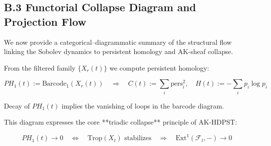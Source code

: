 \documentclass[11pt]{article}
\theoremstyle{definition}
\begin{document}
\subsection*{B.3 Functorial Collapse Diagram and Projection Flow}

We now provide a categorical–diagrammatic summary of the structural flow linking the Sobolev dynamics to persistent homology and AK-sheaf collapse.

\begin{center}
\end{center}

\vspace{0.5em}

From the filtered family $\{X_r(t)\}$ we compute persistent homology:

\[
PH_1(t) := \text{Barcode}_1(X_r(t))
\quad \Rightarrow \quad
C(t) := \sum_i \text{pers}_i^2, \quad H(t) := - \sum_i p_i \log p_i
\]

Decay of $PH_1(t)$ implies the vanishing of loops in the barcode diagram.

\vspace{1em}

\begin{center}
\end{center}

\vspace{0.5em}

This diagram expresses the core **triadic collapse** principle of AK-HDPST:

\[
PH_1(t) \to 0 \quad \Leftrightarrow \quad \text{Trop}(X_t) \text{ stabilizes} \quad \Rightarrow \quad \mathrm{Ext}^1(\mathcal{F}_t, -) \to 0
\]

\vspace{1em}
\end{document}
